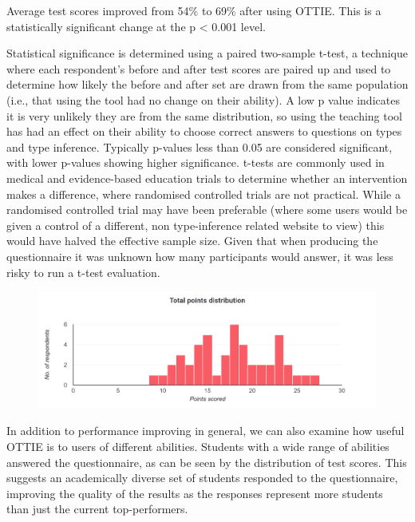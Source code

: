 \documentclass[a4paper,fleqn,oneside,12pt]{report}
\begin{document}
Average test scores improved from 54\% to 69\% after using OTTIE. This is a statistically significant change at the p < 0.001 level.

Statistical significance is determined using a paired two-sample t-test, a technique where each respondent's before and after test scores are paired up and used to determine how likely the before and after set are drawn from the same population (i.e., that using the tool had no change on their ability). A low p value indicates it is very unlikely they are from the same distribution, so using the teaching tool has had an effect on their ability to choose correct answers to questions on types and type inference. Typically p-values less than 0.05 are considered significant, with lower p-values showing higher significance. t-tests are commonly used in medical and evidence-based education trials to determine whether an intervention makes a difference, where randomised controlled trials are not practical. While a randomised controlled trial may have been preferable (where some users would be given a control of a different, non type-inference related website to view) this would have halved the effective sample size. Given that when producing the questionnaire it was unknown how many participants would answer, it was less risky to run a t-test evaluation.

{\centering \begin{figure}[h!]
  \centering
  \includegraphics[width=0.9\linewidth]{images/image3.png}
  \label{figure:evaluation_testperformancedistribution}
\end{figure} \par}

In addition to performance improving in general, we can also examine how useful OTTIE is to users of different abilities. Students with a wide range of abilities answered the questionnaire, as can be seen by the distribution of test scores. This suggests an academically diverse set of students responded to the questionnaire, improving the quality of the results as the responses represent more students than just the current top-performers.
\end{document}

